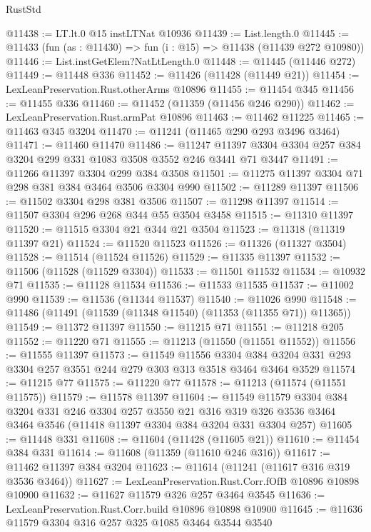 \begin{lexlean}{RustStd}
\begin{coremodule}
{{{{{{{{{{{{{{{{{{{@11438 := LT.lt.{0} @15 instLTNat @10936
@11439 := List.length.{0}
@11445 := @11433 (fun (as : @11430) => fun (i : @15) => @11438 (@11439 @272 @10980))
@11446 := List.instGetElem?NatLtLength.{0}
@11448 := @11445 (@11446 @272)
@11449 := @11448 @336
@11452 := @11426 (@11428 (@11449 @21))
@11454 := LexLeanPreservation.Rust.otherArms @10896
@11455 := @11454 @345
@11456 := @11455 @336
@11460 := @11452 (@11359 (@11456 @246 @290))
@11462 := LexLeanPreservation.Rust.armPat @10896
@11463 := @11462 @11225
@11465 := @11463 @345 @3204
@11470 := @11241 (@11465 @290 @293 @3496 @3464)
@11471 := @11460 @11470
@11486 := @11247 @11397 @3304 @3304 @257 @384 @3204 @299 @331 @1083 @3508 @3552 @246 @3441 @71 @3447
@11491 := @11266 @11397 @3304 @299 @384 @3508
@11501 := @11275 @11397 @3304 @71 @298 @381 @384 @3464 @3506 @3304 @990
@11502 := @11289 @11397
@11506 := @11502 @3304 @298 @381 @3506
@11507 := @11298 @11397
@11514 := @11507 @3304 @296 @268 @344 @55 @3504 @3458
@11515 := @11310 @11397
@11520 := @11515 @3304 @21 @344 @21 @3504
@11523 := @11318 (@11319 @11397 @21)
@11524 := @11520 @11523
@11526 := @11326 (@11327 @3504)
@11528 := @11514 (@11524 @11526)
@11529 := @11335 @11397
@11532 := @11506 (@11528 (@11529 @3304))
@11533 := @11501 @11532
@11534 := @10932 @71
@11535 := @11128 @11534
@11536 := @11533 @11535
@11537 := @11002 @990
@11539 := @11536 (@11344 @11537)
@11540 := @11026 @990
@11548 := @11486 (@11491 (@11539 (@11348 @11540) (@11353 (@11355 @71)) @11365))
@11549 := @11372 @11397
@11550 := @11215 @71
@11551 := @11218 @205
@11552 := @11220 @71
@11555 := @11213 (@11550 (@11551 @11552))
@11556 := @11555 @11397
@11573 := @11549
    @11556
    @3304
    @384
    @3204
    @331
    @293
    @3304
    @257
    @3551
    @244
    @279
    @303
    @313
    @3518
    @3464
    @3464
    @3529
@11574 := @11215 @77
@11575 := @11220 @77
@11578 := @11213 (@11574 (@11551 @11575))
@11579 := @11578 @11397
@11604 := @11549
    @11579
    @3304
    @384
    @3204
    @331
    @246
    @3304
    @257
    @3550
    @21
    @316
    @319
    @326
    @3536
    @3464
    @3464
    @3546
    (@11418 @11397 @3304 @384 @3204 @331 @3304 @257)
@11605 := @11448 @331
@11608 := @11604 (@11428 (@11605 @21))
@11610 := @11454 @384 @331
@11614 := @11608 (@11359 (@11610 @246 @316))
@11617 := @11462 @11397 @384 @3204
@11623 := @11614 (@11241 (@11617 @316 @319 @3536 @3464))
@11627 := LexLeanPreservation.Rust.Corr.fOfB @10896 @10898 @10900
@11632 := @11627 @11579 @326 @257 @3464 @3545
@11636 := LexLeanPreservation.Rust.Corr.build @10896 @10898 @10900
@11645 := @11636 @11579 @3304 @316 @257 @325 @1085 @3464 @3544 @3540
}}}}}}}}}}}}}}}}}}}
\end{coremodule}
\end{lexlean}
